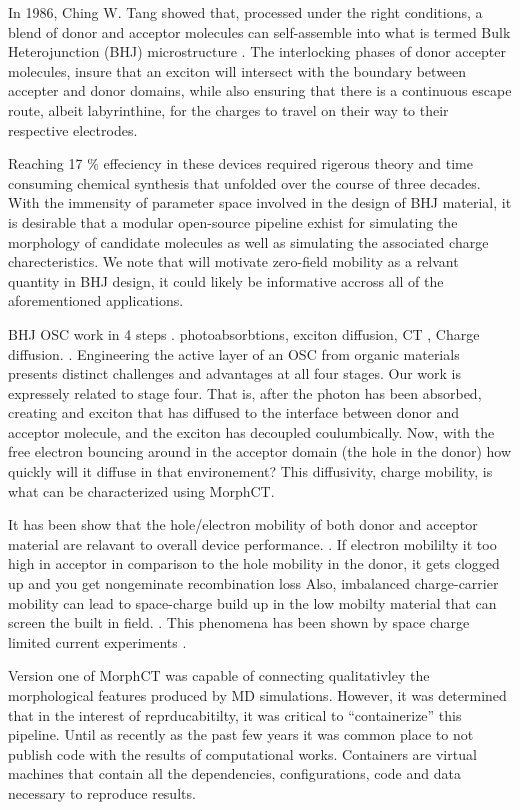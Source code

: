 In 1986, Ching W. Tang
showed that, processed under the right conditions, a blend of donor and acceptor molecules can self-assemble
into what is termed Bulk Heterojunction (BHJ) microstructure \cite{Tang1986c}. 
The interlocking phases of donor accepter molecules, insure
that an exciton will intersect with the boundary between accepter and donor domains, while also ensuring that
there
is a continuous escape route, albeit labyrinthine, for the charges to travel on their way to their respective electrodes. 

Reaching 17 \% effeciency in these devices required rigerous theory and time consuming chemical synthesis
that unfolded over the course of three decades. 
With the immensity of parameter space involved in the design of BHJ material, it is desirable that a modular
open-source pipeline exhist for simulating the morphology of candidate molecules as well as simulating the 
associated charge charecteristics. We note that will motivate zero-field mobility as a relvant quantity in BHJ
design, it could likely be informative accross all of the aforementioned applications. 


BHJ OSC work in 4 steps . photoabsorbtions, exciton diffusion, CT , Charge diffusion. \citet{Fusella2019}.
Engineering the active layer of an OSC from organic materials presents distinct challenges and advantages at
all four stages. 
Our work is expressely related to stage four. That is, after the photon has been absorbed, creating and
exciton that has diffused to the interface between donor and acceptor molecule, and the exciton has decoupled
coulumbically. Now, with the free electron bouncing around in the acceptor domain (the hole in the donor) how
quickly will it diffuse in that environement? This diffusivity, charge mobility, is what can be characterized
using MorphCT.

It has been show that the hole/electron mobility of both donor and acceptor material are
relavant to overall device performance. \cite{Wang2019e}. If electron mobililty it too high
in acceptor in comparison to the hole mobility in the donor, it gets clogged up and you get 
nongeminate recombination loss
Also, imbalanced charge-carrier mobility can lead to space-charge build up in the low mobilty material that
can screen the built in field.  \cite{Bartelt2015}. This phenomena has been shown by space charge limited current experiments \cite{Small2013}.

Version one of MorphCT was capable of
connecting qualitativley the morphological features produced by MD simulations. However, it was determined
that in the interest of reprducabitilty, it was critical to ``containerize'' this pipeline. Until as recently as
the past few years it was common place to not publish code with the results of computational works. Containers
are virtual machines that contain all the dependencies, configurations, code and data necessary to reproduce
results. \cite{Cito2016a}

